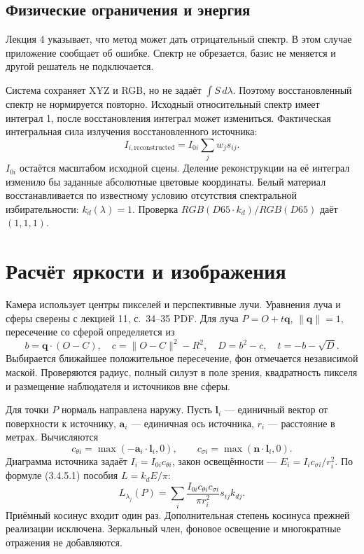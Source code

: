 \documentclass[a4paper,12pt]{article}
\begin{document}
\subsection{Физические ограничения и энергия}
Лекция 4 указывает, что метод может дать отрицательный спектр. В этом случае приложение сообщает об ошибке. Спектр не обрезается, базис не меняется и другой решатель не подключается.

Система сохраняет XYZ и RGB, но не задаёт $\int S\,d\lambda$. Поэтому восстановленный спектр не нормируется повторно. Исходный относительный спектр имеет интеграл 1, после восстановления интеграл может измениться. Фактическая интегральная сила излучения восстановленного источника:
\[
 I_{i,\mathrm{reconstructed}}=I_{0i}\sum_jw_js_{ij}.
\]
$I_{0i}$ остаётся масштабом исходной сцены. Деление реконструкции на её интеграл изменило бы заданные абсолютные цветовые координаты. Белый материал восстанавливается по известному условию отсутствия спектральной избирательности: $k_d(\lambda)=1$. Проверка $RGB(D65\cdot k_d)/RGB(D65)$ даёт $(1,1,1)$.

\section{Расчёт яркости и изображения}
Камера использует центры пикселей и перспективные лучи. Уравнения луча и сферы сверены с лекцией 11, с.~34--35 PDF. Для луча $P=O+t\boldsymbol q$, $\|\boldsymbol q\|=1$, пересечение со сферой определяется из
\[
 b=\boldsymbol q\cdot(O-C),\quad c=\|O-C\|^2-R^2,\quad
 D=b^2-c,\quad t=-b-\sqrt D.
\]
Выбирается ближайшее положительное пересечение, фон отмечается независимой маской. Проверяются радиус, полный силуэт в поле зрения, квадратность пикселя и размещение наблюдателя и источников вне сферы.

Для точки $P$ нормаль направлена наружу. Пусть $\boldsymbol l_i$ --- единичный вектор от поверхности к источнику, $\boldsymbol a_i$ --- единичная ось источника, $r_i$ --- расстояние в метрах. Вычисляются
\[
 c_{\theta i}=\max(-\boldsymbol a_i\cdot\boldsymbol l_i,0),\qquad
 c_{\sigma i}=\max(\boldsymbol n\cdot\boldsymbol l_i,0).
\]
Диаграмма источника задаёт $I_i=I_{0i}c_{\theta i}$, закон освещённости --- $E_i=I_ic_{\sigma i}/r_i^2$. По формуле (3.4.5.1) пособия $L=k_dE/\pi$:
\[
 L_{\lambda_j}(P)=\sum_i\frac{I_{0i}c_{\theta i}c_{\sigma i}}
 {\pi r_i^2}s_{ij}k_{dj}.
\]
Приёмный косинус входит один раз. Дополнительная степень косинуса прежней реализации исключена. Зеркальный член, фоновое освещение и многократные отражения не добавляются.
\end{document}
